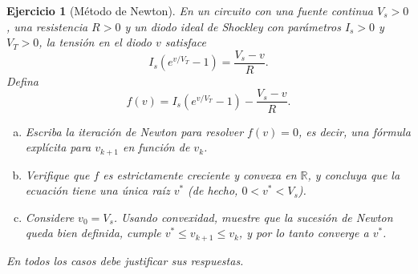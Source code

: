 \documentclass[12pt]{article}%
\def\R{\mathbb{R}}
\newtheorem{exercise}{Ejercicio}
\begin{document}
\begin{exercise}[M\'etodo de Newton]
En un circuito con una fuente continua $V_s>0$, una resistencia $R>0$ y un
diodo ideal de Shockley con par\'ametros $I_s>0$ y $V_T>0$, la tensi\'on en el
diodo $v$ satisface
\[
I_s\left(e^{v/V_T}-1\right)=\frac{V_s-v}{R}.
\]
Defina
\[
f(v)=I_s\left(e^{v/V_T}-1\right)-\frac{V_s-v}{R}.
\]
\begin{enumerate}[(a)]
\item Escriba la iteraci\'on de Newton para resolver $f(v)=0$, es decir,
una f\'ormula expl\'icita para $v_{k+1}$ en funci\'on de $v_k$.
\item Verifique que $f$ es estrictamente creciente y convexa en $\R$, y
concluya que la ecuaci\'on tiene una \'unica ra\'iz $v^*$ (de hecho,
$0<v^*<V_s$).
\item Considere $v_0=V_s$. Usando convexidad, muestre que la sucesi\'on de
Newton queda bien definida, cumple $v^*\le v_{k+1}\le v_k$, y por lo tanto
converge a $v^*$.
\end{enumerate}
\end{exercise}




\vskip 2.5cm
\begin{center}
    \textit{En todos los casos debe justificar sus respuestas.}
\end{center}
\end{document}

